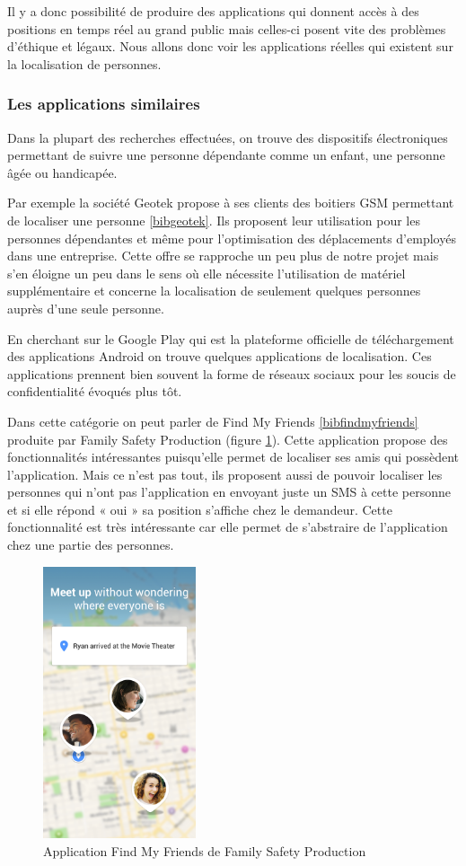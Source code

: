 Il y a donc possibilité de produire des applications qui donnent accès à des positions en temps réel au grand public mais celles-ci posent vite des problèmes d’éthique et légaux. Nous allons donc voir les applications réelles qui existent sur la localisation de personnes.

\subsubsection{Les applications similaires}

Dans la plupart des recherches effectuées, on trouve des dispositifs électroniques permettant de suivre une personne dépendante comme un enfant, une personne âgée ou handicapée.

Par exemple la société Geotek propose à ses clients des boitiers GSM permettant de localiser une personne \ref{bibgeotek}. Ils proposent leur utilisation pour les personnes dépendantes et même pour l’optimisation des déplacements d’employés dans une entreprise. Cette offre se rapproche un peu plus de notre projet mais s’en éloigne un peu dans le sens où elle nécessite l’utilisation de matériel supplémentaire et concerne la localisation de seulement quelques personnes auprès d’une seule personne.

En cherchant sur le Google Play qui est la plateforme officielle de téléchargement des applications Android on trouve quelques applications de localisation. Ces applications prennent bien souvent la forme de réseaux sociaux pour les soucis de confidentialité évoqués plus tôt.

Dans cette catégorie on peut parler de Find My Friends \ref{bibfindmyfriends} produite par Family Safety Production (figure \ref{findmyfriends}). Cette application propose des fonctionnalités intéressantes puisqu’elle permet de localiser ses amis qui possèdent l’application. Mais ce n’est pas tout, ils proposent aussi de pouvoir localiser les personnes qui n’ont pas l’application en envoyant juste un SMS à cette personne et si elle répond « oui » sa position s’affiche chez le demandeur. Cette fonctionnalité est très intéressante car elle permet de s’abstraire de l’application chez une partie des personnes.

\begin{figure}[H]
    \centering
    \includegraphics[height=8cm]{./img/findmyfriends.png}
    \caption{Application Find My Friends de Family Safety Production}
    \label{findmyfriends}
\end{figure}


